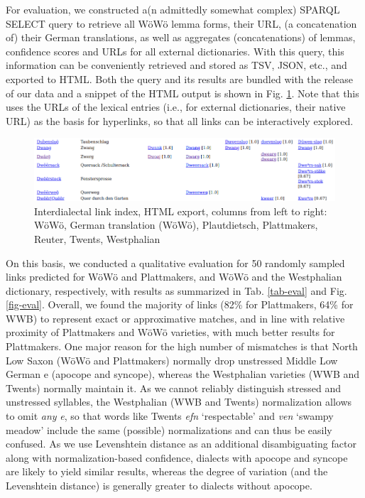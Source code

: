 \documentclass[11pt]{article}
\newcommand{\word}[1]{\textsl{#1}} %
\begin{document}
\begin{enumerate}
For evaluation, we constructed a(n admittedly somewhat complex) SPARQL SELECT query to retrieve all WöWö lemma forms, their URL, (a concatenation of) their German translations, as well as aggregates (concatenations) of lemmas, confidence scores and URLs for all external dictionaries. With this query, this information can be conveniently retrieved and stored as TSV, JSON, etc., and exported to HTML. Both the query and its results are bundled with the release of our data and a snippet of the HTML output is shown in Fig. \ref{fig-interdialectal-links-in-html}. Note that this uses the URLs of the lexical entries (i.e., for external dictionaries, their native URL) as the basis for hyperlinks, so that all links can be interactively explored.


\begin{figure}
    \centering
    \includegraphics[width=1\linewidth]{img/html.png}
    \caption{Interdialectal link index, HTML export, columns from left to right: WöWö, German translation (WöWö), Plautdietsch, Plattmakers, Reuter, Twents, Westphalian}
    \label{fig-interdialectal-links-in-html}
\end{figure}


On this basis, we conducted a qualitative evaluation for 50 randomly sampled links predicted for WöWö and Plattmakers, and WöWö and the Westphalian dictionary, respectively, with results as summarized in Tab. \ref{tab-eval} and Fig. \ref{fig-eval}. 
Overall, we found the majority of links (82\% for Plattmakers, 64\% for WWB) to represent exact or approximative matches, and in line with relative proximity of Plattmakers and WöWö varieties, with much better results for Plattmakers. One major reason for the high number of mismatches is that North Low Saxon (WöWö and Plattmakers) normally drop unstressed Middle Low German e (apocope and syncope), whereas the Westphalian varieties (WWB and Twents) normally maintain it. 
As we cannot reliably distinguish stressed and unstressed syllables, the Westphalian (WWB and Twents) normalization allows to omit \emph{any} \word{e}, so that words like Twents \word{efn} `respectable' and \word{ven} `swampy meadow' include the same (possible) normalizations and can thus be easily confused. As we use Levenshtein distance as an additional disambiguating factor along with normalization-based confidence, dialects with apocope and syncope are likely to yield similar results, whereas the degree of variation (and the Levenshtein distance) is generally greater to dialects without apocope.


\end{enumerate}
\end{document}
